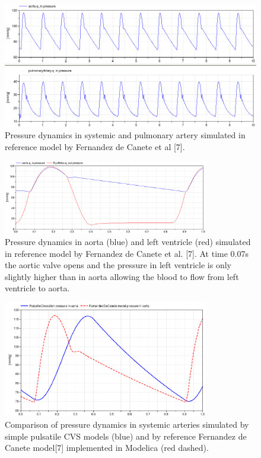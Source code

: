 {
\makeatletter 
\renewcommand{\thefigure}{\@arabic\c@figure}
\setcounter{figure}{11}
\selectfont

\begin{figure}[ht]
    \centering
    \includegraphics[width=1\textwidth]{appendix/appendix4-fig12.png}
    \caption{\selectfont
Pressure dynamics in systemic and pulmonary artery simulated in reference model by Fernandez de Canete et al [7].
    }
\end{figure}

\begin{figure}[ht]
    \centering
    \includegraphics[width=0.8\textwidth]{appendix/appendix4-fig13.png}
    \caption{\selectfont
Pressure dynamics in aorta (blue) and left ventricle (red) simulated in reference model by Fernandez de Canete et al. [7]. At time 0.07s the aortic valve opens and the pressure in left ventricle is only slightly higher than in aorta allowing the blood to flow from left ventricle to aorta.
    }
\end{figure}

\begin{figure}[ht]
    \centering
    \includegraphics[width=0.8\textwidth]{appendix/appendix4-fig14.png}
    \caption{\selectfont
Comparison of pressure dynamics in systemic arteries simulated by simple pulsatile CVS models (blue) and by reference Fernandez de Canete model[7] implemented in Modelica (red dashed).
    }
\end{figure}

\makeatother
}